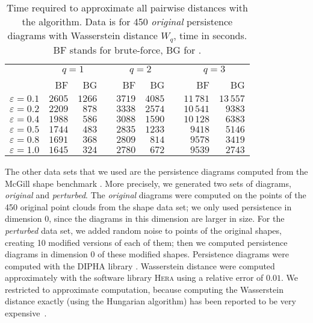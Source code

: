 \documentclass[]{ws-ijcga}
\newcommand{\eps}{\varepsilon}
\newcommand{\dtype}[1]{{\textit{\small #1}}}
\newcommand{\libraryname}[1]{{\textsc{#1}}\xspace}
\newcommand{\hera}{\libraryname{Hera}}
\begin{document}
\begin{table}\centering
    \begin{tabular}{@{}rrrcrrcrr@{}}\toprule
                          & \multicolumn{2}{c}{$q=1$} & \phantom{c} & \multicolumn{2}{c}{$q=2$} & \phantom{c} & \multicolumn{2}{c}{$q=3$}\\
                          \cmidrule{2-3} \cmidrule{5-6} \cmidrule{8-9}
                          & BF & BG && BF & BG && BF & BG \\ \midrule
$\eps = 0.1$    &   $2605$  &  $1266$  &&  $3719$  &  $4085$  &&  $11\,781$  &  $13\,557$\\
$\eps = 0.2$    &   $2209$  &  $878$  &&  $3338$  &  $2574$  &&  $10\,541$  &  $9383$ \\
$\eps = 0.4$    &   $1988$  &  $586$  &&  $3088$  &  $1590$  &&  $10\,128$    &  $6383$ \\
$\eps = 0.5$    &   $1744$  &  $483$  &&  $2835$  &  $1233$  &&  $9418$    &  $5146$ \\
$\eps = 0.8$    &   $1691$  &  $368$  &&  $2809$  &  $814$  &&  $9578$    &  $3419$ \\
$\eps = 1.0$    &   $1645$  &  $324$  &&  $2780$  &  $672$  &&  $9539$    &  $2743$ \\
\bottomrule
\end{tabular}
    \caption{Time required to approximate all pairwise distances with the \bgrdy algorithm.
    Data is for 450 \dtype{original} persistence diagrams with Wasserstein distance $W_q$, time in seconds.
    BF stands for brute-force, BG for \bgrdy.}
\label{tbl:mcgill_original_blind_greedy_spanner_timing}
\end{table}



The other data sets that we used
are the persistence diagrams
computed from the McGill shape benchmark \cite{zhang2005mcgill}.
More precisely, we generated two sets of diagrams,
\dtype{original} and \dtype{perturbed}. The \dtype{original}
diagrams were computed on the points of the 450 original
point clouds from the shape data set; we only used
persistence in dimension 0, since the diagrams in this dimension are larger in size.
For the \dtype{perturbed} data set,
we added random noise to points of the original shapes,
creating 10 modified versions of each of them;
then we computed persistence diagrams in dimension 0 of these modified
shapes.
Persistence diagrams were computed with the \libraryname{DIPHA}
library \cite{bauer2014distributed}. 
Wasserstein distance were computed approximately
with the software library \hera using a relative error of $0.01$.
We restricted to approximate computation, because computing the
Wasserstein distance exactly (using the Hungarian algorithm)
has been reported to be very expensive~\cite{kerber2017geometry}.
\end{document}
